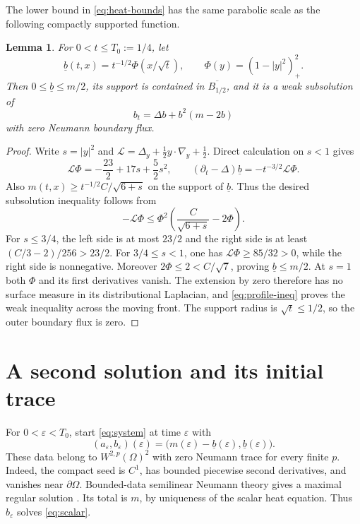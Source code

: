 \documentclass[11pt]{article}
\newtheorem{lemma}[theorem]{Lemma}
\theoremstyle{definition}
\newcommand{\Om}{\Omega}
\newcommand{\ub}{\underline b}
\begin{document}
The lower bound in \eqref{eq:heat-bounds} has the same parabolic scale as
the following compactly supported function.
\begin{lemma}\label{lem:subsolution}
For $0<t\le T_0:=1/4$, let
\[
 \ub(t,x)=t^{-1/2}\Phi(x/\sqrt t),\qquad
 \Phi(y)=(1-|y|^2)_+^2.
\]
Then $0\le\ub\le m/2$, its support is contained in $\overline{B_{1/2}}$,
and it is a
weak subsolution of
\begin{equation}\label{eq:scalar}
 b_t=\Delta b+b^2(m-2b)
\end{equation}
with zero Neumann boundary flux.
\end{lemma}
\begin{proof}
Write $s=|y|^2$ and
$\mathcal L=\Delta_y+\frac12 y\cdot\nabla_y+\frac12$. Direct calculation
on $s<1$ gives
\[
 \mathcal L\Phi=-\frac{23}{2}+17s+\frac52s^2,
 \qquad(\partial_t-\Delta)\ub=-t^{-3/2}\mathcal L\Phi.
\]
Also $m(t,x)\ge t^{-1/2}C/\sqrt{6+s}$ on the support of $\ub$. Thus the
desired subsolution inequality follows from
\begin{equation}\label{eq:profile-ineq}
 -\mathcal L\Phi\le\Phi^2
                \left(\frac C{\sqrt{6+s}}-2\Phi\right).
\end{equation}
For $s\le3/4$, the left side is at most $23/2$ and the right side is at
least $(C/3-2)/256>23/2$. For $3/4\le s<1$, one has
$\mathcal L\Phi\ge85/32>0$, while the right side is nonnegative.
Moreover $2\Phi\le2<C/\sqrt7$, proving $\ub\le m/2$.
At $s=1$ both $\Phi$ and its first derivatives vanish. The extension by
zero therefore has no surface measure in its distributional Laplacian,
and \eqref{eq:profile-ineq} proves the weak inequality across the moving
front. The support radius is $\sqrt t\le1/2$, so the outer boundary flux
is zero.
\end{proof}

\section{A second solution and its initial trace}

For $0<\varepsilon<T_0$, start \eqref{eq:system} at time $\varepsilon$ with
\begin{equation}\label{eq:seed-data}
 (a_\varepsilon,b_\varepsilon)(\varepsilon)
       =\bigl(m(\varepsilon)-\ub(\varepsilon),\ub(\varepsilon)\bigr).
\end{equation}
These data belong to $W^{2,p}(\Om)^2$ with zero Neumann trace for every
finite $p$. Indeed, the compact seed is $C^1$, has bounded piecewise second
derivatives, and vanishes near $\partial\Om$. Bounded-data semilinear
Neumann theory gives a maximal regular solution
\cite[Example~3.7 and Theorem~3.9]{SchnaubeltNonlinear}.
Its total is $m$, by uniqueness of the scalar heat equation. Thus
$b_\varepsilon$ solves \eqref{eq:scalar}.
\end{document}
